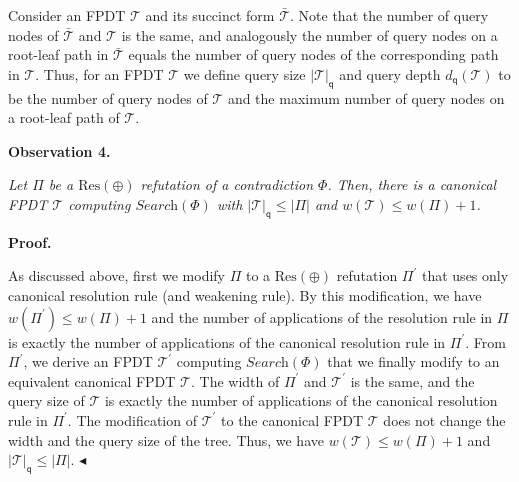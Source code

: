 Consider an FPDT $\mathcal{T}$ and its succinct form $\bar{\mathcal{T}}$.
Note that the number of query nodes of $\bar{\mathcal{T}}$ and $\mathcal{T}$ is the same,
and analogously the number of query nodes on a root-leaf path in $\bar{\mathcal{T}}$ equals the number of query nodes of the corresponding path in $\mathcal{T}$.
Thus, for an FPDT $\mathcal{T}$ we define query size $|\mathcal{T}|_{\mathsf{q}}$ and query depth $d_{\mathsf{q}}(\mathcal{T})$ to be the number of query nodes of $\mathcal{T}$ and the maximum number of query nodes on a root-leaf path of $\mathcal{T}$.\par





\par\medskip\noindent\textbf{
\textbf{Observation 4}\textbf{.}
}\par



\emph{Let $\Pi$ be a $\text{Res}(\oplus)$ refutation of a contradiction $\Phi$.
Then, there is a canonical FPDT $\mathcal{T}$ computing $\textit{Search}(\Phi)$ with $|\mathcal{T}|_{\mathsf{q}}\leq|\Pi|$ and $w(\mathcal{T})\leq w(\Pi)+1$.}\par






\par\medskip\noindent\textbf{Proof.}\par




As discussed above, first we modify $\Pi$ to a $\text{Res}(\oplus)$ refutation $\Pi^{\prime}$ that uses only canonical resolution rule (and weakening rule).
By this modification, we have $w(\Pi^{\prime})\leq w(\Pi)+1$ and the number of applications of the resolution rule in $\Pi$ is exactly the number of applications of the canonical resolution rule in $\Pi^{\prime}$.
From $\Pi^{\prime}$, we derive an FPDT $\mathcal{T}^{\prime}$ computing $\textit{Search}(\Phi)$ that we finally modify to an equivalent canonical FPDT $\mathcal{T}$.
The width of $\Pi^{\prime}$ and $\mathcal{T}^{\prime}$ is the same, and the query size of $\mathcal{T}$ is exactly the number of applications of the canonical resolution rule in $\Pi^{\prime}$.
The modification of $\mathcal{T}^{\prime}$ to the canonical FPDT $\mathcal{T}$ does not change the width and the query size of the tree.
Thus, we have $w(\mathcal{T})\leq w(\Pi)+1$ and $|\mathcal{T}|_{\mathsf{q}}\leq|\Pi|$.
$\blacktriangleleft$\par




